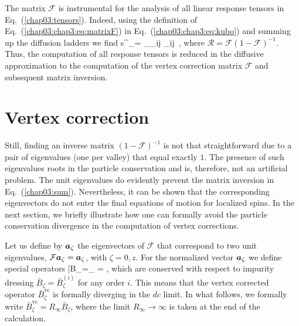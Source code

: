 The matrix $\mathcal{F}$ is instrumental for the analysis of all linear response tensors in Eq.~(\ref{chap03:tensors}). Indeed, using the definition of Eq.~(\ref{chap03:chap3:eq:matrixF}) in Eq.~(\ref{chap03:chap3:eq:kubo}) and summing up the diffusion ladders we find
\be
\label{chap03:final}
\delta s^\pm_\alpha = 
\s_\beta \s_{ij}  _{ij}  \,,
\e
where $\mathcal{R}=\mathcal{F}(1-\mathcal{F})^{-1}$. Thus, the computation of all response tensors is reduced in the diffusive approximation to the computation of the vertex correction matrix $\mathcal{F}$ and subsequent matrix inversion.  

\section{Vertex correction}\label{chap03:sec:appc}

Still, finding an inverse matrix $(1-\mathcal{F})^{-1}$ is not that straightforward due to a pair of eigenvalues (one per valley) that equal exactly $1$. The presence of such eigenvalues roots in the particle conservation and is, therefore, not an artificial problem. The unit eigenvalues do evidently prevent the matrix inversion in Eq.~(\ref{chap03:sum}). Nevertheless, it can be shown that the corresponding eigenvectors do not enter the final equations of motion for localized spins. In the next section, we briefly illustrate how one can formally avoid the particle conservation divergence in the computation of vertex corrections.

Let us define by $\boldsymbol{a}_\zeta$ the eigenvectors of $\mathcal{F}$ that correspond to two unit eigenvalues, $\mathcal{F}\boldsymbol{a}_\zeta=\boldsymbol{a}_\zeta$, with $\zeta=0, z$. For the  normalized vector $\boldsymbol{a}_\zeta$ we define special operators
\be
\label{chap03:Bdiv}
\bar{B}_\zeta=_\zeta \cdot {} 
= ,
\e
which are conserved with respect to impurity dressing $\bar{B}_\zeta=\bar{B}_\zeta^{(i)}$ for any order $i$. This means that the vertex corrected operator $\bar{B}_\zeta^\textrm{vc}$ is formally diverging in the $dc$ limit. In what follows, we formally write $\bar{B}_\zeta^{\text{vc}} = R_\infty \bar{B}_\zeta$, where the limit $R_\infty \to \infty$ is taken at the end of the calculation.


